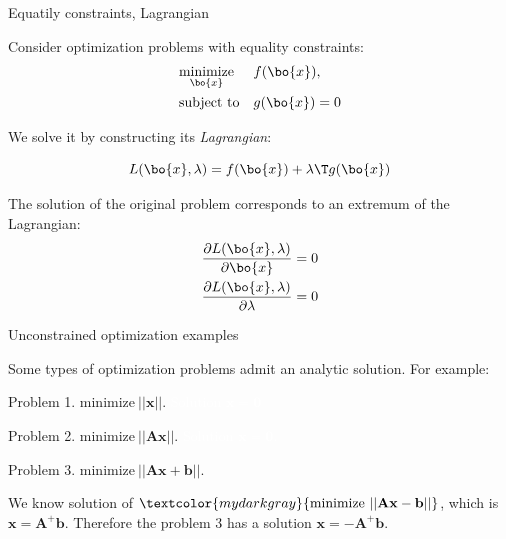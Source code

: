 \documentclass{beamer}
\begin{document}
\begin{frame}{Equatily constraints, Lagrangian}
	\begin{flushleft}
		
		Consider optimization problems with equality constraints:
		\begin{equation}
			\begin{aligned}
				& \underset{\bo{x}}{\text{minimize}}
				& & f(\bo{x}), \\
				& \text{subject to}
				& & g(\bo{x}) = 0
			\end{aligned}
		\end{equation}
		
		We solve it by constructing its \emph{Lagrangian}:
		
		\begin{equation}
			L(\bo{x}, \lambda) = f(\bo{x}) + \lambda\T g(\bo{x})
		\end{equation}
		
		The solution of the original problem corresponds to an extremum of the Lagrangian:
		\begin{align}
			\frac{\partial L(\bo{x}, \lambda)}{\partial \bo{x}} = 0
			\\
			\frac{\partial L(\bo{x}, \lambda)}{\partial \lambda} = 0
		\end{align}
		
	\end{flushleft}
\end{frame}



\begin{frame}{Unconstrained optimization examples}
\begin{flushleft}
	

Some types of optimization problems admit an analytic solution. For example:
	

Problem 1. $\text{minimize} \ ||\mathbf{x}||$. \textcolor{white}{Solution $\mathbf{x} = \mathbf{0}$} 

\bigskip

Problem 2. $\text{minimize} \ ||\mathbf{A}\mathbf{x}||$. \textcolor{white}{Solution $\mathbf{x} = \mathbf{0}$.}

\bigskip

Problem 3. $\text{minimize} \ ||\mathbf{A}\mathbf{x} + \mathbf{b}||$. 

\bigskip

We know solution of $\textcolor{mydarkgray}{\text{minimize} \ ||\mathbf{A}\mathbf{x} - \mathbf{b}||}$, which is $\mathbf{x} = \mathbf{A}^+ \mathbf{b}$. Therefore the problem 3 has a solution $\mathbf{x} = -\mathbf{A}^+ \mathbf{b}$.
 
\end{flushleft}
\end{frame}
\end{document}
